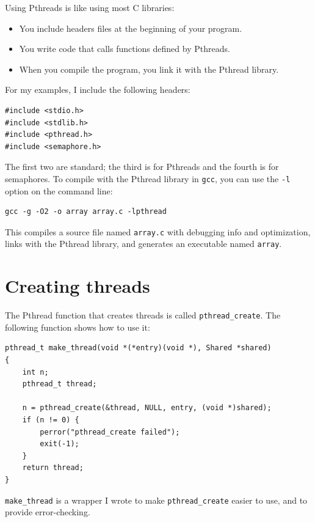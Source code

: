 \documentclass[12pt]{book}
\begin{document}
{Using Pthreads is like using most C libraries:

\begin{itemize}

\item You include headers files at the beginning of your
program.

\item You write code that calls functions defined by Pthreads.

\item When you compile the program, you link it with the Pthread library.

\end{itemize}

For my examples, I include the following headers:

\begin{verbatim}
#include <stdio.h>
#include <stdlib.h>
#include <pthread.h>
#include <semaphore.h>
\end{verbatim}

The first two are standard; the third is for Pthreads and
the fourth is for semaphores.  To compile with the Pthread library in {\tt gcc}, you can use the {\tt -l} option on the command line:

\begin{verbatim}
gcc -g -O2 -o array array.c -lpthread
\end{verbatim}

This compiles a source file named {\tt array.c} with debugging info
and optimization, links with the Pthread library, and generates an
executable named {\tt array}.


\section{Creating threads}

The Pthread function that creates threads is called \verb"pthread_create".
The following function shows how to use it:

\begin{verbatim}
pthread_t make_thread(void *(*entry)(void *), Shared *shared)
{
    int n;
    pthread_t thread;

    n = pthread_create(&thread, NULL, entry, (void *)shared);
    if (n != 0) {
        perror("pthread_create failed");
        exit(-1);
    }
    return thread;
}
\end{verbatim}

\verb"make_thread" is a wrapper I wrote to make
\verb"pthread_create" easier to use, and to provide error-checking.

}
\end{document}
